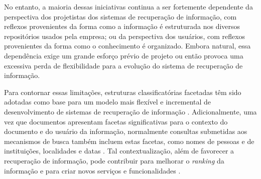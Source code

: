 No entanto, a maioria dessas iniciativas continua a ser fortemente dependente da perspectiva dos projetistas dos sistemas de recuperação de informação, com reflexos provenientes da forma como a informação é estruturada nos diversos repositórios usados pela empresa; ou da perspectiva dos usuários, com reflexos provenientes da forma como o conhecimento é organizado. Embora natural, essa dependência exige um grande esforço prévio de projeto ou então provoca uma excessiva perda de flexibilidade para a evolução do sistema de recuperação de informação. 

Para contornar essas limitações, estruturas classificatórias facetadas têm sido adotadas como base para um modelo mais flexível e incremental de desenvolvimento de sistemas de recuperação de informação \cite{broughton2006,docubrowse10}. Adicionalmente, uma vez que documentos apresentam facetas significativas para o contexto do documento e do usuário da informação, normalmente consultas submetidas aos mecanismos de busca também incluem estas facetas, como nomes de pessoas e de instituições, localidades e datas \cite{rosieJones08,docubrowse10,mir2ed}. Tal contextualização, além de favorecer a recuperação de informação, pode contribuir para melhorar o \textit{ranking} da informação e para criar novos serviços e funcionalidades \cite{borges07}.



